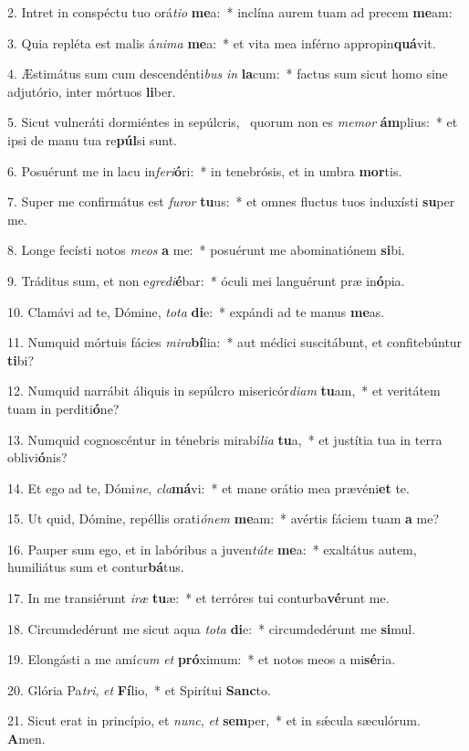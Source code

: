 2. Intret in conspéctu tuo orá\textit{ti}\textit{o} \textbf{me}a:~*  inclína aurem tuam ad precem \textbf{me}am:\

3. Quia repléta est malis á\textit{ni}\textit{ma} \textbf{me}a:~*  et vita mea inférno appropin\textbf{quá}vit.\

4. Æstimátus sum cum descendénti\textit{bus} \textit{in} \textbf{la}cum:~*  factus sum sicut homo sine adjutório, inter mórtuos \textbf{li}ber.\

5. Sicut vulneráti dormiéntes in sepúlcris, \dag\  quorum non es \textit{me}\textit{mor} \textbf{ám}plius:~*  et ipsi de manu tua re\textbf{púl}si sunt.\

6. Posuérunt me in lacu in\textit{fe}\textit{ri}\textbf{ó}ri:~*  in tenebrósis, et in umbra \textbf{mor}tis.\

7. Super me confirmátus est \textit{fu}\textit{ror} \textbf{tu}us:~*  et omnes fluctus tuos induxísti \textbf{su}per me.\

8. Longe fecísti notos \textit{me}\textit{os} \textbf{a} me:~*  posuérunt me abominatiónem \textbf{si}bi.\

9. Tráditus sum, et non e\textit{gre}\textit{di}\textbf{é}bar:~*  óculi mei languérunt præ in\textbf{ó}pia.\

10. Clamávi ad te, Dómine, \textit{to}\textit{ta} \textbf{di}e:~*  expándi ad te manus \textbf{me}as.\

11. Numquid mórtuis fácies \textit{mi}\textit{ra}\textbf{bí}lia:~*  aut médici suscitábunt, et confitebúntur \textbf{ti}bi?\

12. Numquid narrábit áliquis in sepúlcro misericór\textit{di}\textit{am} \textbf{tu}am,~*  et veritátem tuam in perditi\textbf{ó}ne?\

13. Numquid cognoscéntur in ténebris mirabí\textit{li}\textit{a} \textbf{tu}a,~*  et justítia tua in terra oblivi\textbf{ó}nis?\

14. Et ego ad te, Dómi\textit{ne}, \textit{cla}\textbf{má}vi:~*  et mane orátio mea prævéni\textbf{et} te.\

15. Ut quid, Dómine, repéllis orati\textit{ó}\textit{nem} \textbf{me}am:~*  avértis fáciem tuam \textbf{a} me?\

16. Pauper sum ego, et in labóribus a juven\textit{tú}\textit{te} \textbf{me}a:~*  exaltátus autem, humiliátus sum et contur\textbf{bá}tus.\

17. In me transiérunt \textit{i}\textit{ræ} \textbf{tu}æ:~*  et terróres tui conturba\textbf{vé}runt me.\

18. Circumdedérunt me sicut aqua \textit{to}\textit{ta} \textbf{di}e:~*  circumdedérunt me \textbf{si}mul.\

19. Elongásti a me amí\textit{cum} \textit{et} \textbf{pró}ximum:~*  et notos meos a mi\textbf{sé}ria.\

20. Glória Pa\textit{tri}, \textit{et} \textbf{Fí}lio,~*  et Spirítui \textbf{Sanc}to.\

21. Sicut erat in princípio, et \textit{nunc}, \textit{et} \textbf{sem}per,~*  et in sǽcula sæculórum. \textbf{A}men.\

